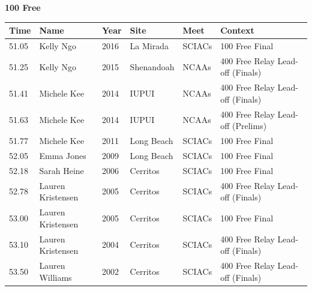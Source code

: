 \vspace{1.2em}
\noindent\begin{minipage}[t]{0.98\textwidth}
\centering
\textbf{\textcolor{teamprimary}{100 Free}}\par
\vspace{0.5em}
\centering
\small
\renewcommand{\arraystretch}{1.0}
\setlength{\tabcolsep}{4pt}
\begin{tabular}{@{}p{2.0cm}p{3.2cm}p{1.2cm}p{2.0cm}p{2.0cm}p{2.5cm}@{}}
\toprule
\textbf{Time} & \textbf{Name} & \textbf{Year} & \textbf{Site} & \textbf{Meet} & \textbf{Context} \\
\midrule
51.05 & Kelly Ngo & 2016 & La Mirada & SCIACs & 100 Free Final \\
51.25 & Kelly Ngo & 2015 & Shenandoah & NCAAs & 400 Free Relay Lead-off (Finals) \\
51.41 & Michele Kee & 2014 & IUPUI & NCAAs & 400 Free Relay Lead-off (Finals) \\
51.63 & Michele Kee & 2014 & IUPUI & NCAAs & 400 Free Relay Lead-off (Prelims) \\
51.77 & Michele Kee & 2011 & Long Beach & SCIACs & 100 Free Final  \\
52.05 & Emma Jones & 2009 & Long Beach & SCIACs & 100 Free Final  \\
52.18 & Sarah Heine & 2006 & Cerritos & SCIACs & 100 Free Final  \\
52.78 & Lauren Kristensen & 2005 & Cerritos & SCIACs & 400 Free Relay Lead-off (Finals) \\
53.00 & Lauren Kristensen & 2005 & Cerritos & SCIACs & 100 Free Final \\
53.10 & Lauren Kristensen & 2004 & Cerritos & SCIACs & 400 Free Relay Lead-off (Finals) \\
53.50 & Lauren Williams & 2002 & Cerritos & SCIACs & 400 Free Relay Lead-off (Finals) \\
\bottomrule
\end{tabular}
\end{minipage}
\vspace{1.2em}
